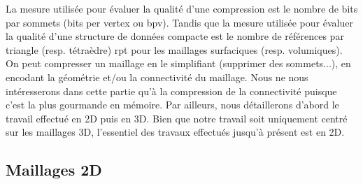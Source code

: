 \documentclass[a4paper,11pt,openany]{article}
\begin{document}
La mesure utilisée pour évaluer la qualité d'une compression est le nombre de bits par sommets (bits per vertex ou bpv). Tandis que la mesure utilisée pour évaluer la qualité d'une structure de données compacte est le nombre de références par triangle (resp. tétraèdre) rpt pour les maillages surfaciques (resp. volumiques).\\
On peut compresser un maillage en le simplifiant (supprimer des sommets...), en encodant la géométrie et/ou la connectivité du maillage. Nous ne nous intéresserons dans cette partie qu'à la compression de la connectivité puisque c'est la plus gourmande en mémoire. Par ailleurs, nous détaillerons d'abord le travail effectué en 2D puis en 3D. Bien que notre travail soit uniquement centré sur les maillages 3D, l'essentiel des travaux effectués jusqu'à présent est en 2D.
\subsection{Maillages 2D}
\end{document}
